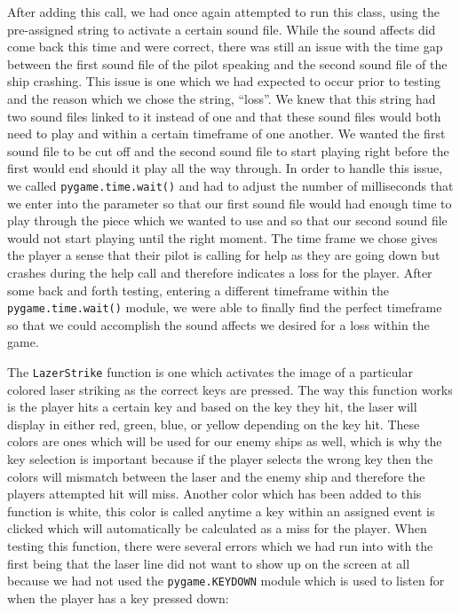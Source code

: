 \inputminted[baselinestretch=1]{python}{../code/game_sound_init_call.py}

After adding this call, we had
once again attempted to run this class, using the pre-assigned
string to activate a certain sound file. While the sound affects did
come back this time and were correct, there was still an issue with
the time gap between the first sound file of the pilot speaking and
the second sound file of the ship crashing. This issue is one which
we had expected to occur prior to testing and the reason which we
chose the string, “loss”. We knew that this string had two sound
files linked to it instead of one and that these sound files would
both need to play and within a certain timeframe of one another.  We
wanted the first sound file to be cut off and the second sound file
to start playing right before the first would end should it play all
the way through. In order to handle this issue, we called
\texttt{pygame.time.wait()} and had to adjust the number
of milliseconds that we enter into the parameter so that our first
sound file would had enough time to play through the piece which we
wanted to use and so that our second sound file would not start
playing until the right moment. The time frame we chose gives the
player a sense that their pilot is calling for help as they are
going down but crashes during the help call and therefore indicates
a loss for the player. After some back and forth testing, entering a
different timeframe within the \texttt{pygame.time.wait()}
module, we were able to finally find the perfect timeframe so that
we could accomplish the sound affects we desired for a loss within
the game.

The \texttt{LazerStrike} function is one which activates
the image of a particular colored laser striking as the correct keys
are pressed.  The way this function works is the player hits a
certain key and based on the key they hit, the laser will display in
either red, green, blue, or yellow depending on the key hit. These
colors are ones which will be used for our enemy ships as well,
which is why the key selection is important because if the player
selects the wrong key then the colors will mismatch between the
laser and the enemy ship and therefore the players attempted hit
will miss.  Another color which has been added to this function is
white, this color is called anytime a key within an assigned event
is clicked which will automatically be calculated as a miss for the
player.  When testing this function, there were several errors which
we had run into with the first being that the laser line did not
want to show up on the screen at all because we had not used the
\texttt{pygame.KEYDOWN} module which is used to listen
for when the player has a key pressed down:

